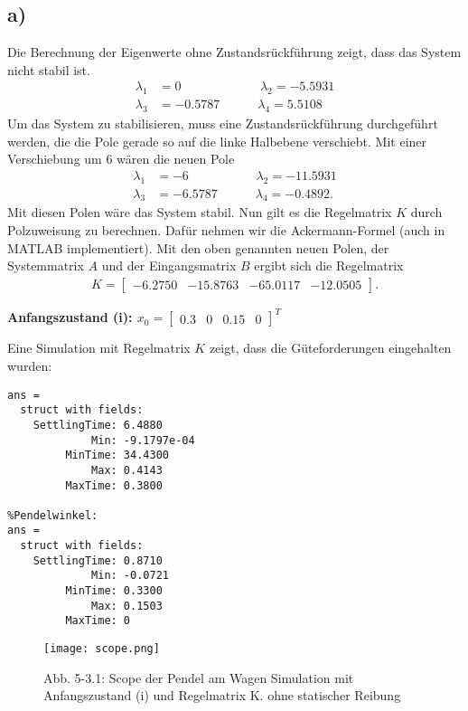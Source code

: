 \documentclass[11pt]{scrartcl} %
\begin{document}
\subsection*{a)}
Die Berechnung der Eigenwerte ohne Zustandsrückführung zeigt, dass das System nicht stabil ist.
\begin{align*}
\lambda_1 &= 0 \quad\quad\quad\quad\quad\quad\hspace{3pt} \lambda_2 =  -5.5931\\
\lambda_3 &= -0.5787 \quad\quad\quad \lambda_4 = 5.5108
\end{align*}
Um das System zu stabilisieren, muss eine Zustandsrückführung durchgeführt werden, die die Pole gerade so auf die linke Halbebene verschiebt. Mit einer Verschiebung um 6 wären die neuen Pole
\begin{align*}
\lambda_1 &= -6 \quad\quad\quad\quad\quad\hspace{4pt} \lambda_2 =  -11.5931\\
\lambda_3 &= -6.5787 \quad\quad\quad \lambda_4 = -0.4892.
\end{align*}
Mit diesen Polen wäre das System stabil. Nun gilt es die Regelmatrix $K$ durch Polzuweisung zu berechnen. Dafür nehmen wir die Ackermann-Formel (auch in MATLAB implementiert). Mit den oben genannten neuen Polen, der Systemmatrix $A$ und der Eingangsmatrix $B$ ergibt sich die Regelmatrix
\begin{align*}
K=\begin{bmatrix}
-6.2750 & -15.8763 & -65.0117 & -12.0505
\end{bmatrix}.
\end{align*}

\pagebreak
\textbf{Anfangszustand (i): $x_0 = \begin{bmatrix}
0.3 & 0 & 0.15 & 0
\end{bmatrix}^T$}

Eine Simulation mit Regelmatrix $K$ zeigt, dass die Güteforderungen eingehalten wurden:
\begin{Verbatim}[frame=single]
%Wagenposition: 
ans = 
  struct with fields:
    SettlingTime: 6.4880
             Min: -9.1797e-04
         MinTime: 34.4300
             Max: 0.4143
         MaxTime: 0.3800

%Pendelwinkel:
ans = 
  struct with fields:
    SettlingTime: 0.8710
             Min: -0.0721
         MinTime: 0.3300
             Max: 0.1503
         MaxTime: 0
\end{Verbatim}

\begin{figure}[H]
	\centering
	\texttt{[image: scope.png]}
	\captionsetup{labelformat=empty}
	\caption{\small{Abb. 5-3.1: Scope der Pendel am Wagen Simulation mit Anfangszustand (i) und Regelmatrix K. ohne statischer Reibung}}
\end{figure}
\end{document}
